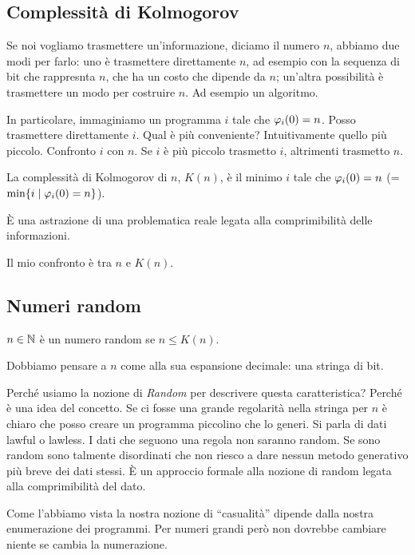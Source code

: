 \subsection{Complessità di Kolmogorov}

Se noi vogliamo trasmettere un'informazione, diciamo il numero $n$, abbiamo due modi per farlo: uno
è trasmettere direttamente $n$, ad esempio con la sequenza di bit che rappresnta $n$, che ha un
costo che dipende da $n$; un'altra possibilità è trasmettere un modo per costruire $n$. Ad esempio un
algoritmo.

In particolare, immaginiamo un programma $i$ tale che $\varphi_{i}(0) = n$. Posso trasmettere direttamente
$i$. Qual è più conveniente? Intuitivamente quello più piccolo. Confronto $i$ con $n$. Se $i$ è più
piccolo trasmetto $i$, altrimenti trasmetto $n$.

\begin{defn}
    La complessità di Kolmogorov di $n$, $K(n)$, è il minimo $i$ tale che $\varphi_{i}(0) = n$ (=
    $\min\{i \mid \varphi_{i}(0) = n\}$).
\end{defn}

È una astrazione di una problematica reale legata alla comprimibilità delle informazioni.

Il mio confronto è tra $n$ e $K(n)$.

\subsection{Numeri random}

\begin{defn}
    $n \in \mathbb{N}$ è un numero random se $n \leq K(n)$.
\end{defn}

Dobbiamo pensare a $n$ come alla sua espansione decimale: una stringa di bit.

Perché usiamo la nozione di \textit{Random} per descrivere questa caratteristica? Perché è una
idea del concetto. Se ci fosse una grande regolarità nella stringa per $n$ è chiaro che posso creare
un programma piccolino che lo generi. Si parla di dati lawful o lawless. I dati che seguono una
regola non saranno random. Se sono random sono talmente disordinati che non riesco a dare nessun
metodo generativo più breve dei dati stessi. È un approccio formale alla nozione di random legata
alla comprimibilità del dato.

Come l'abbiamo vista la nostra nozione di ``casualità'' dipende dalla nostra enumerazione dei programmi.
Per numeri grandi però non dovrebbe cambiare niente se cambia la numerazione.

